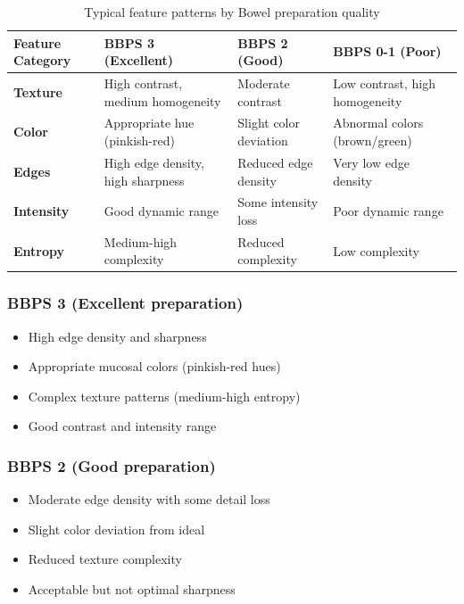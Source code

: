 \documentclass[11pt]{article}
\begin{document}
\begin{table}[H]
\centering
\caption{Typical feature patterns by Bowel preparation quality}
\begin{tabular}{p{3cm}p{4cm}p{4cm}p{4cm}}
\toprule
\textbf{Feature Category} & \textbf{BBPS 3 (Excellent)} & \textbf{BBPS 2 (Good)} & \textbf{BBPS 0-1 (Poor)} \\
\midrule
\textbf{Texture} & High contrast, medium homogeneity & Moderate contrast & Low contrast, high homogeneity \\
\textbf{Color} & Appropriate hue (pinkish-red) & Slight color deviation & Abnormal colors (brown/green) \\
\textbf{Edges} & High edge density, high sharpness & Reduced edge density & Very low edge density \\
\textbf{Intensity} & Good dynamic range & Some intensity loss & Poor dynamic range \\
\textbf{Entropy} & Medium-high complexity & Reduced complexity & Low complexity \\
\bottomrule
\end{tabular}
\end{table}

\subsubsection{BBPS 3 (Excellent preparation)}
\begin{itemize}
    \item High edge density and sharpness
    \item Appropriate mucosal colors (pinkish-red hues)
    \item Complex texture patterns (medium-high entropy)
    \item Good contrast and intensity range
\end{itemize}

\subsubsection{BBPS 2 (Good preparation)}
\begin{itemize}
    \item Moderate edge density with some detail loss
    \item Slight color deviation from ideal
    \item Reduced texture complexity
    \item Acceptable but not optimal sharpness
\end{itemize}
\end{document}
